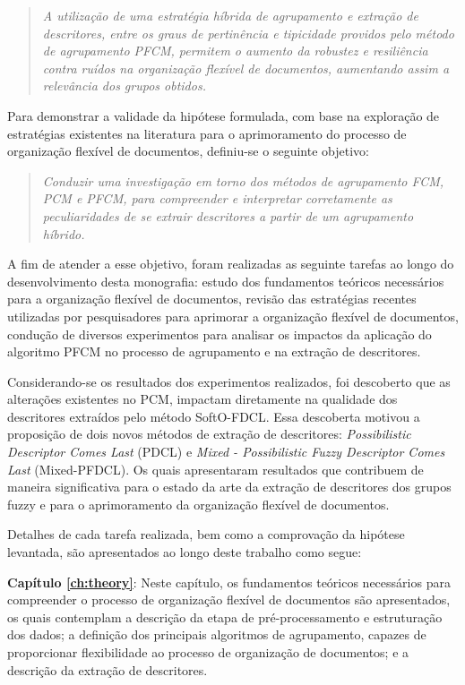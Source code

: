 \begin{quote}
\textit{A utilização de uma estratégia híbrida de agrupamento e extração de descritores, entre os 
  graus de pertinência e tipicidade providos pelo método de agrupamento PFCM, permitem o aumento da
    robustez e resiliência contra ruídos na organização flexível de documentos, aumentando assim a
    relevância dos grupos obtidos.}
\end{quote}

Para demonstrar a validade da hipótese formulada, com base na exploração de estratégias existentes
na literatura para o aprimoramento do processo de organização flexível de documentos, definiu-se o seguinte objetivo: 

\begin{quote}
\textit{Conduzir uma investigação em torno dos métodos de agrupamento FCM, PCM e PFCM, para
compreender e interpretar corretamente as peculiaridades de se extrair descritores a partir de um
agrupamento híbrido.}
\end{quote}

A fim de atender a esse objetivo, foram realizadas as seguinte tarefas ao longo do desenvolvimento desta monografia: estudo dos fundamentos teóricos necessários para a organização flexível de documentos, revisão das estratégias recentes
utilizadas por pesquisadores para aprimorar a organização flexível de documentos, condução de diversos experimentos para analisar os impactos da aplicação do algoritmo PFCM no processo de agrupamento e na extração de descritores.

Considerando-se os resultados dos experimentos realizados, foi descoberto que as alterações existentes no PCM, impactam diretamente na qualidade dos descritores extraídos pelo método SoftO-FDCL. Essa descoberta motivou a proposição de dois novos métodos de extração de descritores: {\it Possibilistic Descriptor Comes Last\/} (PDCL) e {\it Mixed - Possibilistic Fuzzy Descriptor Comes Last\/} (Mixed-PFDCL). Os quais apresentaram resultados que
contribuem de maneira significativa para o estado da arte da extração de descritores dos grupos
fuzzy e para o aprimoramento da organização flexível de documentos.

Detalhes de cada tarefa realizada, bem como a comprovação da hipótese levantada, são apresentados ao longo deste trabalho como segue:

{\bf Capítulo \ref{ch:theory}\/}: Neste capítulo, os fundamentos teóricos necessários para compreender o processo de organização flexível de documentos são apresentados, os quais contemplam a descrição da
etapa de pré-processamento e estruturação dos dados; a definição dos principais algoritmos de
agrupamento, capazes de proporcionar flexibilidade ao processo de organização de documentos; e a descrição da extração de
descritores.

